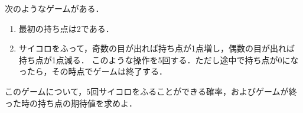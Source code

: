 \documentclass[../../main.tex]{subfiles}
\begin{document}
次のようなゲームがある．
\begin{enumerate}
  \item [\ding{"AC}]最初の持ち点は2である．
  \item [\ding{"AD}]サイコロをふって，奇数の目が出れば持ち点が1点増し，偶数の目が出れば持ち点が1点減る．
    このような操作を5回する．ただし途中で持ち点が0になったら，その時点でゲームは終了する．
\end{enumerate}
このゲームについて，5回サイコロをふることができる確率，およびゲームが終った時の持ち点の期待値を求めよ．
\end{document}
